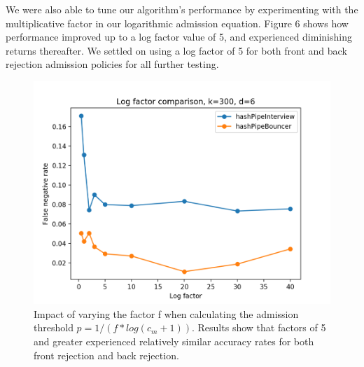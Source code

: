We were also able to tune our algorithm's performance by experimenting with the multiplicative factor in our logarithmic admission equation. Figure 6 shows how performance improved up to a log factor value of 5, and experienced diminishing returns thereafter. We settled on using a log factor of 5 for both front and back rejection admission policies for all further testing.
\begin{figure}[t]
  \centering
    \includegraphics[scale=0.5]{log}
     \caption{Impact of varying the factor f when calculating the admission threshold $p = 1 / (f*log(c_m + 1))$. Results show that factors of 5 and greater experienced relatively similar accuracy rates for both front rejection and back rejection.}
     \label{fig:bp-image}
\end{figure}
